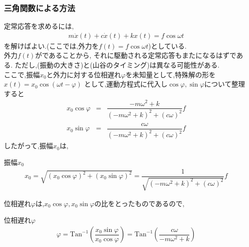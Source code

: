 \documentclass[a4paper]{jsarticle}
\begin{document}
\subsubsection{三角関数による方法}
定常応答を求めるには,
\begin{eqnarray*}
    m \ddot{x}\left(t\right)+c\dot{x}\left(t\right)+kx\left(t\right)=f\cos\omega t
\end{eqnarray*}
を解けばよい.(ここでは,外力を$f\left(t\right)=f\cos\omega t$)としている.\\
外力$f\left(t\right)$がであることから,
それに駆動される定常応答もまたになるはずである.
ただし,(振動の大きさ)と(山谷のタイミング)は異なる可能性がある.\\
ここで,振幅$x_0$と外力に対する位相遅れ$\varphi$を未知量として,特殊解の形を$x\left(t\right)=x_0\cos\left(\omega t-\varphi\right)$
として,運動方程式に代入し$\cos\varphi,\sin\varphi$について整理すると
\begin{eqnarray*}
    x_0\cos\varphi&=&\dfrac{-m\omega^2+k}{\left(-m\omega^2+k\right)^2+\left(c\omega\right)^2}f\\
    x_0\sin\varphi&=&\dfrac{c\omega}{\left(-m\omega^2+k\right)^2+\left(c\omega\right)^2}f
\end{eqnarray*}
したがって,振幅$x_0$は,
\begin{itembox}[l]{振幅$x_0$}
    \begin{eqnarray*}
        x_0=\sqrt{\left(x_0\cos\varphi\right)^2+\left(x_0\sin\varphi\right)^2}=\dfrac{1}{\sqrt{\left(-m\omega^2+k\right)^2+\left(c\omega\right)^2}}f
    \end{eqnarray*}
\end{itembox}
位相遅れ$\varphi$は,$x_0\cos\varphi,x_0\sin\varphi$の比をとったものであるので,
\begin{itembox}[l]{位相遅れ$\varphi$}
    \begin{eqnarray*}
        \varphi=\mathrm{Tan}^{-1}\left(\dfrac{x_0\sin\varphi}{x_0\cos\varphi}\right)=\mathrm{Tan}^{-1}\left(\dfrac{c\omega}{-m\omega^2+k}\right)
    \end{eqnarray*}
\end{itembox}
\end{document}
